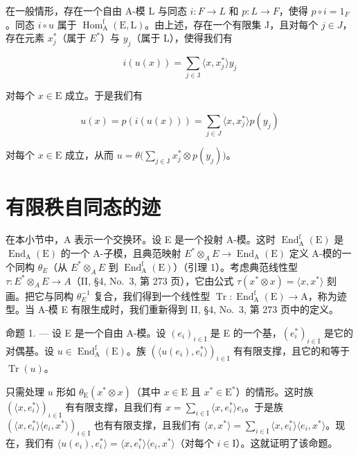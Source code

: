 在一般情形，存在一个自由 A-模 L 与同态 \(i: F \to L\) 和 \(p: L \to F\)，使得 \(p \circ i = 1_{F}\)。同态 \(i \circ u\) 属于 \(\operatorname{Hom}_{\mathrm{A}}^{\mathrm{f}}(\mathrm{E}, \mathrm{L})\)。由上述，存在一个有限集 J，且对每个 \(j \in J\)，存在元素 \(x_{j}^{*}\)（属于 \(E^{*}\)）与 \(y_{j}\)（属于 L），使得我们有

\[
i (u (x)) = \sum_ {j \in \mathrm{J}} \langle x, x _ {j} ^ {*} \rangle y _ {j}
\]

对每个 \(x \in \mathrm{E}\) 成立。于是我们有

\[
u (x) = p \left(i (u (x))\right) = \sum_ {j \in J} \langle x, x _ {j} ^ {*} \rangle p \left(y _ {j}\right)
\]

对每个 \(x \in \mathrm{E}\) 成立，从而 \(u = \theta\big(\sum_{j \in \mathrm{J}} x_j^* \otimes p(y_j)\big)\)。

\section{有限秩自同态的迹}

在本小节中，A 表示一个交换环。设 E 是一个投射 A-模。这时 \(\operatorname{End}_{\mathrm{A}}^{\mathrm{f}}(\mathrm{E})\) 是 \(\operatorname{End}_{\mathrm{A}}(\mathrm{E})\) 的一个 A-子模，且典范映射 \(E^{*}\otimes_{A}E\to\operatorname{End}_{\mathrm{A}}(\mathrm{E})\) 定义 A-模的一个同构 \(\theta_{E}\)（从 \(E^{*}\otimes_{A}E\) 到 \(\operatorname{End}_{\mathrm{A}}^{\mathrm{f}}(\mathrm{E})\)）（引理 1）。考虑典范线性型 \(\tau:E^{*}\otimes_{A}E\to A\)（II, §4, No.~3, 第 273 页），它由公式 \(\tau(x^{*}\otimes x)=\langle x,x^{*}\rangle\) 刻画。把它与同构 \(\theta_{E}^{-1}\) 复合，我们得到一个线性型 \(\operatorname{Tr}: \operatorname{End}_{\mathrm{A}}^{\mathrm{f}}(\mathrm{E})\to\mathrm{A}\)，称为迹型。当 A-模 E 有限生成时，我们重新得到 II, §4, No.~3, 第 273 页中的定义。

命题 1. --- 设 E 是一个自由 A-模。设 \((e_{i})_{i\in\mathrm{I}}\) 是 E 的一个基，\((e_{i}^{*})_{i\in\mathrm{I}}\) 是它的对偶基。设 \(u\in\operatorname{End}_{\mathrm{A}}^{\mathrm{f}}(\mathrm{E})\)。族 \((\langle u(e_{i}),e_{i}^{*}\rangle)_{i\in\mathrm{I}}\) 有有限支撑，且它的和等于 \(\operatorname{Tr}(u)\)。

只需处理 \(u\) 形如 \(\theta_{\mathrm{E}}(x^{*} \otimes x)\)（其中 \(x \in \mathrm{E}\) 且 \(x^{*} \in \mathrm{E}^{*}\)）的情形。这时族 \((\langle x, e_{i}^{*} \rangle)_{i \in \mathrm{I}}\) 有有限支撑，且我们有 \(x = \sum_{i \in \mathrm{I}} \langle x, e_{i}^{*} \rangle e_{i}\)。于是族 \((\langle x, e_{i}^{*} \rangle \langle e_{i}, x^{*} \rangle)_{i \in \mathrm{I}}\) 也有有限支撑，且我们有 \(\langle x, x^{*} \rangle = \sum_{i \in \mathrm{I}} \langle x, e_{i}^{*} \rangle \langle e_{i}, x^{*} \rangle\)。现在，我们有 \(\langle u(e_{i}), e_{i}^{*} \rangle = \langle x, e_{i}^{*} \rangle \langle e_{i}, x^{*} \rangle\)（对每个 \(i \in \mathrm{I}\)）。这就证明了该命题。

